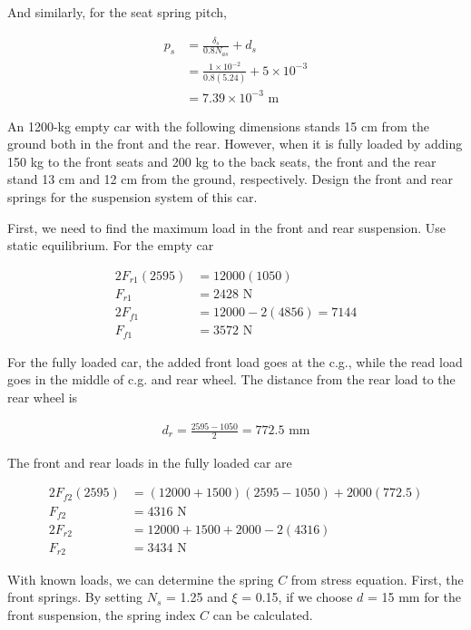 \documentclass[a4paper,openany,12pt]{book}
\begin{document}
{{And similarly, for the seat spring pitch,

$$\begin{aligned}
    p_s &= \frac{\delta _s}{0.8N_{as}} + d_s \\ 
          &= \frac{1 \times 10^{-2}}{0.8(5.24)} + 5 \times 10^{-3} \\ 
          &= 7.39 \times 10^{-3}\text{ m}
  \end{aligned}$$

An 1200-kg empty car with the following dimensions stands 15 cm from the
ground both in the front and the rear. However, when it is fully loaded
by adding 150 kg to the front seats and 200 kg to the back seats, the
front and the rear stand 13 cm and 12 cm from the ground, respectively.
Design the front and rear springs for the suspension system of this car.

First, we need to find the maximum load in the front and rear
suspension. Use static equilibrium. For the empty car

$$\begin{aligned}
     2F_{r1}(2595) &= 12000(1050) \\
     F_{r1} &= 2428 \text{ N} \\
     2F_{f1} &= 12000 - 2(4856) = 7144 \\
     F_{f1} &= 3572 \text{ N}
   \end{aligned}$$

For the fully loaded car, the added front load goes at the c.g., while
the read load goes in the middle of c.g. and rear wheel. The distance
from the rear load to the rear wheel is

$$\begin{gathered}
     d_r = \frac{2595 - 1050}{2} = 772.5 \text{ mm}
   \end{gathered}$$

The front and rear loads in the fully loaded car are

$$\begin{aligned}
     2F_{f2}(2595) &= (12000 + 1500)(2595 - 1050) + 2000(772.5) \\
     F_{f2} &= 4316 \text{ N} \\
     2F_{r2} &= 12000 + 1500 + 2000 - 2(4316) \\
     F_{r2} &= 3434 \text{ N}
   \end{aligned}$$

With known loads, we can determine the spring \(C\) from stress equation.
First, the front springs. By setting \(N_s\) = 1.25 and \(\xi\) = 0.15, if
we choose \(d\) = 15 mm for the front suspension, the spring index \(C\) can
be calculated.

}}
\end{document}
